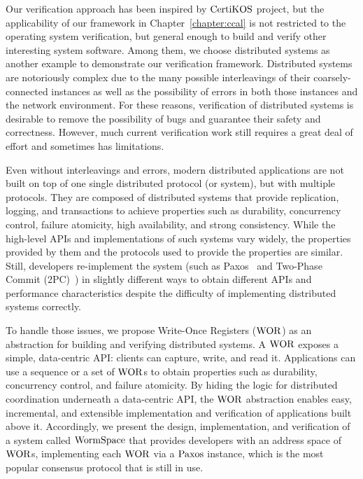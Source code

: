 Our verification approach has been inspired by $\mathrm{CertiKOS}$ project,
but the applicability of our framework in Chapter~\ref{chapter:ccal} is not restricted to the operating system verification, but general enough
to build and verify other interesting system software. 
Among them, we choose distributed systems as another example to demonstrate our 
verification framework.
Distributed systems are notoriously complex due to the many possible interleavings of their coarsely-connected 
instances as well as the possibility of errors in both those instances and the network environment. 
For these reasons, verification of distributed systems is desirable to remove the possibility of bugs and guarantee their safety and correctness. 
However, much current verification work still requires a great deal of effort and sometimes has limitations.

Even without interleavings and errors, 
modern distributed applications are not built on top of one single distributed protocol (or system), but with multiple protocols.
They are composed of distributed systems that provide replication, 
logging, and transactions to achieve properties such as durability, concurrency control, failure atomicity, high availability, and strong consistency.
While the high-level APIs and implementations of such systems vary widely, 
the properties provided by them and the protocols used to provide the properties are similar. 
Still, developers re-implement the system (such as Paxos~\cite{paxos} and 
Two-Phase Commit (2PC)~\cite{2PC}) in slightly different ways to obtain different APIs and performance 
characteristics despite the difficulty of implementing distributed systems correctly.

To handle those issues, we propose Write-Once Registers ($\mathrm{WOR}$) as an abstraction for building and verifying distributed systems. 
A $\mathrm{WOR}$ exposes a simple, data-centric API: 
clients can capture, write, and read it. 
Applications can use a sequence or a set of $\mathrm{WOR}$s to obtain properties such as durability, concurrency control, and failure atomicity. 
By hiding the logic for distributed coordination underneath a data-centric API, the $\mathrm{WOR}$ abstraction enables easy, incremental, 
and extensible implementation and verification of applications built above it. 
Accordingly, we present the design, implementation, and verification of a system called $\mathrm{WormSpace}$ 
that provides developers with an address space of $\mathrm{WOR}$s, implementing each $\mathrm{WOR}$ via a $\mathrm{Paxos}$ instance,
which is the most popular consensus protocol that is still in use. 

